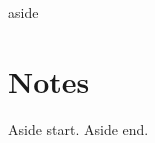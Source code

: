 \documentclass{vitae}
\begin{document}
\placeaside
\makemasthead
{}
\begin{region}{aside}
  \section{Notes}
  \raggedright
  Aside start. \lipsum[1-12] Aside end.
\end{region}
\end{document}
